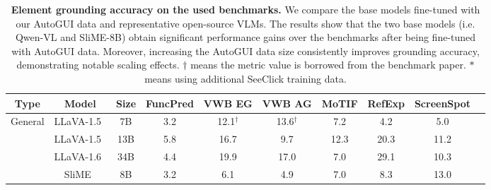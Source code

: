 \begin{table}[]
\scriptsize
\centering
\caption{\textbf{Element grounding accuracy on the used benchmarks.} We compare the base models fine-tuned with our AutoGUI data and representative open-source VLMs. The results show that the two base models (i.e. Qwen-VL and SliME-8B) obtain significant performance gains over the benchmarks after being fine-tuned with AutoGUI data. Moreover, increasing the AutoGUI data size consistently improves grounding accuracy, demonstrating notable scaling effects. $\dag$ means the metric value is borrowed from the benchmark paper. $*$ means using additional SeeClick training data.}
\label{tab:eval results}
\begin{tabular}{@{}cccccccccc@{}}
\toprule
Type & Model    & Size    & FuncPred & VWB EG & VWB AG & MoTIF & RefExp & ScreenSpot  \\ \midrule
\multirow{5}{*}{General} & LLaVA-1.5~\citep{liu2023llava} & 7B & 3.2      &        12.1$^{\dag}$        &     13.6$^{\dag}$           &  7.2   &  4.2 & 5.0 & \\
 & LLaVA-1.5~\citep{liu2023llava} & 13B & 5.8      &           16.7     &        9.7        &   12.3 &  20.3   & 11.2 &  \\
 & LLaVA-1.6~\citep{liu2024llavanext} & 34B &  4.4      &      19.9          &    17.0            &   7.0 &  29.1  & 10.3 &  \\
 & SliME~\citep{slime} & 8B &  3.2  &   6.1       &     4.9     & 7.0  &  8.3  &  13.0  \\ 


\end{tabular}
\end{table}
